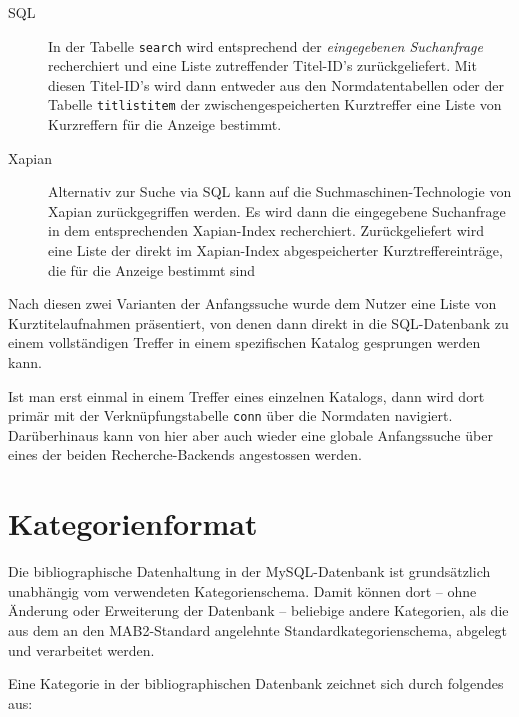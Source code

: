 \documentclass[11pt, twoside, a4paper, BCOR8mm, DIV12, bibtotoc,idxtotoc]{scrbook}
\begin{document}
\begin{description}
\item[SQL] In der Tabelle \texttt{search} wird entsprechend der
  \emph{eingegebenen Suchanfrage} recherchiert und eine Liste
  zutreffender Titel-ID's zurückgeliefert. Mit diesen Titel-ID's
  wird dann entweder aus den Normdatentabellen oder der Tabelle
  \texttt{titlistitem} der
  zwischengespeicherten Kurz\-treffer  eine Liste
  von Kurzreffern für die Anzeige bestimmt.
\item[Xapian] Alternativ zur Suche via SQL kann auf die
  Suchmaschinen-Technologie von Xapian zurückgegriffen werden. Es wird
  dann die eingegebene Suchanfrage in dem entsprechenden Xapian-Index
  recherchiert. Zurückgeliefert wird eine Liste der direkt im
  Xapian-Index abgespeicherter Kurztreffereinträge, die für die
  Anzeige bestimmt sind
\end{description}

Nach diesen zwei Varianten der Anfangssuche wurde dem Nutzer eine
Liste von Kurztitelaufnahmen präsentiert, von denen dann direkt in die
SQL-Datenbank zu einem vollständigen Treffer in einem spezifischen
Katalog gesprungen werden kann.

Ist man erst einmal in einem Treffer eines einzelnen Katalogs, dann
wird dort primär mit der Verknüpfungstabelle \texttt{conn} über die
Normdaten navigiert. Darüberhinaus kann von hier aber auch wieder eine
globale Anfangssuche über eines der beiden Recherche-Backends angestossen
werden.


\section{Kategorienformat}

Die bibliographische Datenhaltung in der MySQL-Datenbank ist
grundsätzlich unabhängig vom verwendeten Kategorienschema. Damit
können dort -- ohne Änderung oder Erweiterung der Datenbank --
beliebige andere Kategorien, als die aus dem an den MAB2-Standard angelehnte
Standardkategorien\-schema, abgelegt und verarbeitet werden.

Eine Kategorie in der bibliographischen Datenbank zeichnet sich durch
folgendes aus:
\end{document}
